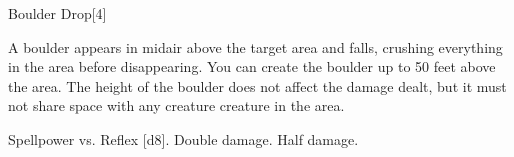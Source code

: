 \begin{spellsection}{Boulder Drop}[4]
    \begin{spellheader}
    \end{spellheader}
    \begin{spellcontent}
        \begin{spelltargetinginfo}
        \end{spelltargetinginfo}
        \begin{spelleffects}
            \spelleffect A boulder appears in midair above the target area and falls, crushing everything in the area before disappearing. You can create the boulder up to 50 feet above the area. The height of the boulder does not affect the damage dealt, but it must not share space with any creature creature in the area.
            \begin{spellattack}{Spellpower vs. Reflex}
                \spellsuccess {}[d8].
                \spellcritical Double damage.
                \spellfailure Half damage.
            \end{spellattack}
        \end{spelleffects}
    \end{spellcontent}
    \begin{spellfooter}
        \miscastexplode
    \end{spellfooter}
    \begin{spellaugments}
    \end{spellaugments}
\end{spellsection}

